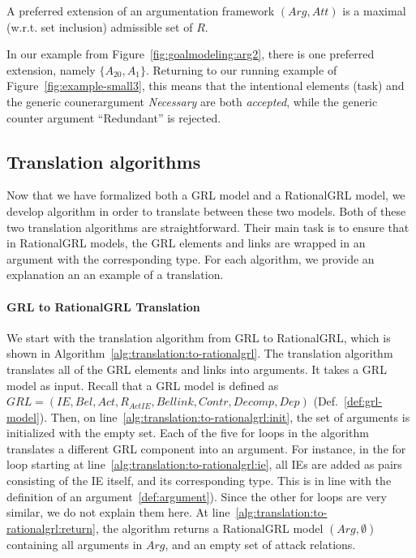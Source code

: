 \begin{definition} 
\label{def:preferred-semantics}
A preferred extension of an argumentation framework $(Arg,Att)$ is a maximal (w.r.t. set inclusion) admissible set of $R$.
\end{definition}

In our example from Figure~\ref{fig:goalmodeling:arg2}, there is one preferred extension, namely $\{A_{20},A_1\}$. Returning to our running example of Figure~\ref{fig:example-small3}, this means that the intentional elements  (task) and the generic counerargument \emph{Necessary} are both \emph{accepted}, while the generic counter argument ``Redundant'' is rejected.

\subsection{Translation algorithms}

Now that we have formalized both a GRL model and a RationalGRL model, we develop algorithm in order to translate between these two models. Both of these two translation algorithms are straightforward. Their main task is to ensure that in RationalGRL models, the GRL elements and links are wrapped in an argument with the corresponding type. For each algorithm, we provide an explanation an an example of a translation.

\paragraph{GRL to RationalGRL Translation} We start with the translation algorithm from GRL to RationalGRL, which is shown in Algorithm~\ref{alg:translation:to-rationalgrl}.  The translation algorithm translates all of the GRL elements and links into arguments. It takes a GRL model as input. Recall that a GRL model is defined as $GRL=(IE, Bel, Act, R_{ActIE}, Bellink, Contr, Decomp, Dep)$ (Def.~\ref{def:grl-model}). Then, on line~\ref{alg:translation:to-rationalgrl:init}, the set of arguments is initialized with the empty set. Each of the five for loops in the algorithm translates a different GRL component into an argument. For instance, in the for loop starting at line~\ref{alg:translation:to-rationalgrl:ie}, all IEs are added as pairs consisting of the IE itself, and its corresponding type. This is in line with the definition of an argument~\ref{def:argument}). Since the other for loops are very similar, we do not explain them here. At line~\ref{alg:translation:to-rationalgrl:return}, the algorithm returns a RationalGRL model $(Arg,\emptyset)$ containing all arguments in $Arg$, and an empty set of attack relations. 

